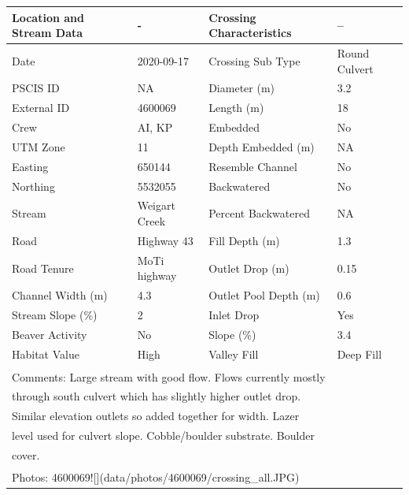 \documentclass[
]{book}
\begin{document}
\begin{tabular}{llll}
\toprule
Location and Stream Data & - & Crossing Characteristics & --\\
\midrule
Date & 2020-09-17 & Crossing Sub Type & Round Culvert\\
PSCIS ID & NA & Diameter (m) & 3.2\\
External ID & 4600069 & Length (m) & 18\\
Crew & AI, KP & Embedded & No\\
UTM Zone & 11 & Depth Embedded (m) & NA\\
\addlinespace
Easting & 650144 & Resemble Channel & No\\
Northing & 5532055 & Backwatered & No\\
Stream & Weigart Creek & Percent Backwatered & NA\\
Road & Highway 43 & Fill Depth (m) & 1.3\\
Road Tenure & MoTi highway & Outlet Drop (m) & 0.15\\
\addlinespace
Channel Width (m) & 4.3 & Outlet Pool Depth (m) & 0.6\\
Stream Slope (\%) & 2 & Inlet Drop & Yes\\
Beaver Activity & No & Slope (\%) & 3.4\\
Habitat Value & High & Valley Fill & Deep Fill\\
\bottomrule
\multicolumn{4}{l}{\textsuperscript{} Comments: Large stream with good flow. Flows currently mostly}\\
\multicolumn{4}{l}{through south culvert which has slightly higher outlet drop.}\\
\multicolumn{4}{l}{Similar elevation outlets so added together for width. Lazer}\\
\multicolumn{4}{l}{level used for culvert slope. Cobble/boulder substrate. Boulder}\\
\multicolumn{4}{l}{cover.}\\
\multicolumn{4}{l}{\textsuperscript{} Photos: 4600069![](data/photos/4600069/crossing\_all.JPG)}\\
\end{tabular}
\end{document}

